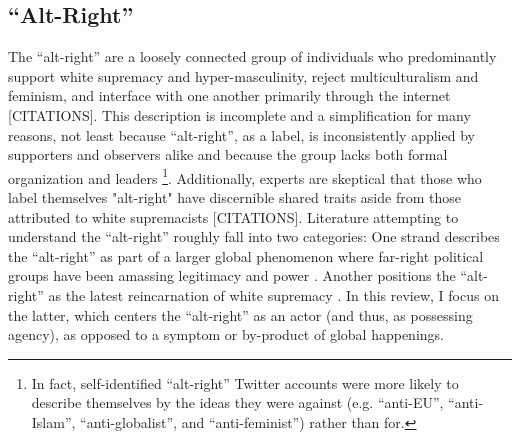 \documentclass[acmlarge, screen, authorversion]{acmart}
\begin{document}
\subsection{``Alt-Right''}

The ``alt-right” are a loosely connected group of individuals who predominantly support white supremacy and hyper-masculinity, reject multiculturalism and feminism, and interface with one another primarily through the internet
[CITATIONS]. This description is incomplete and a simplification for
many reasons, not least because ``alt-right'', as a label, is inconsistently applied by supporters and observers alike and because the group lacks both formal organization and leaders \cite{hawleyMakingSenseAltright2017} \footnote{In fact, self-identified “alt-right” Twitter accounts
were more likely to describe themselves by the ideas they were against
(e.g. “anti-EU”, “anti-Islam”, “anti-globalist”, and “anti-feminist”)
rather than for.}. Additionally, experts are skeptical that those who label themselves "alt-right" have discernible shared traits aside from those attributed to white supremacists
[CITATIONS]. Literature attempting to understand the ``alt-right” roughly fall into two categories: One strand describes the ``alt-right'' as part
of a larger global phenomenon where far-right political groups have been
amassing legitimacy and power \cite{worthMorbidSymptomsGlobal2019}. Another positions the
``alt-right” as the latest reincarnation of white supremacy 
\cite{hawleyMakingSenseAltright2017, mainRiseAltRight2018}. In this review,
I focus on the latter, which centers the ``alt-right'' as an actor (and thus, as possessing agency), as opposed to a symptom or by-product of global happenings.
\end{document}
